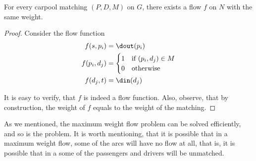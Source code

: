 \begin{observation}
For every carpool matching $(P, D, M)$ on $G$, there exists a flow $f$ on $N$
with the same weight.
\end{observation}

\begin{proof}
Consider the flow function
\begin{align*}
f(s, p_i)		& = \dout(p_i)		 				\\
f(p_i, d_j)		& = 
				\begin{cases}
				1 & \text{if } (p_i, d_j) \in M		\\
				0 & \text{otherwise}
				\end{cases}						\\
f(d_j, t) 	& = \din(d_j) 
\end{align*}

It is easy to verify, that $f$ is indeed a flow function.
Also, observe, that by construction,
the weight of $f$ equals to the weight of the matching.
\end{proof}

As we mentioned, 
the maximum weight flow problem can be solved efficiently, 
and so is the \FIXEDCARPOOL{} problem.
It is worth mentioning, that it is possible that in a maximum weight flow, 
some of the arcs will have no flow at all, 
that is, it is possible that in a \FIXEDCARPOOL{}
some of the passengers and drivers will be unmatched.  